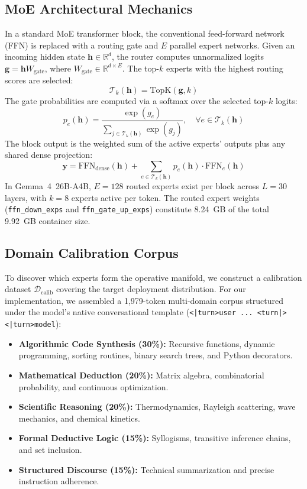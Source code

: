 \documentclass[conference]{IEEEtran}
\newcommand{\R}{\mathbb{R}}
\begin{document}
\subsection{MoE Architectural Mechanics}
In a standard MoE transformer block, the conventional feed-forward network (FFN) is replaced with a routing gate and $E$ parallel expert networks. Given an incoming hidden state $\mathbf{h} \in \R^d$, the router computes unnormalized logits $\mathbf{g} = \mathbf{h} W_\text{gate}$, where $W_\text{gate} \in \R^{d \times E}$. The top-$k$ experts with the highest routing scores are selected:
\begin{equation}
\mathcal{T}_k(\mathbf{h}) = \text{TopK}(\mathbf{g}, k)
\end{equation}
The gate probabilities are computed via a softmax over the selected top-$k$ logits:
\begin{equation}
p_e(\mathbf{h}) = \frac{\exp(g_e)}{\sum_{j \in \mathcal{T}_k(\mathbf{h})} \exp(g_j)}, \quad \forall e \in \mathcal{T}_k(\mathbf{h})
\end{equation}
The block output is the weighted sum of the active experts' outputs plus any shared dense projection:
\begin{equation}
\mathbf{y} = \text{FFN}_\text{dense}(\mathbf{h}) + \sum_{e \in \mathcal{T}_k(\mathbf{h})} p_e(\mathbf{h}) \cdot \text{FFN}_e(\mathbf{h})
\end{equation}
In Gemma~4~26B-A4B, $E = 128$ routed experts exist per block across $L = 30$ layers, with $k = 8$ experts active per token. The routed expert weights (\texttt{ffn\_down\_exps} and \texttt{ffn\_gate\_up\_exps}) constitute 8.24~GB of the total 9.92~GB container size.

\subsection{Domain Calibration Corpus}
To discover which experts form the operative manifold, we construct a calibration dataset $\mathcal{D}_\text{calib}$ covering the target deployment distribution. For our implementation, we assembled a 1,979-token multi-domain corpus structured under the model's native conversational template (\texttt{<|turn>user ... <turn|> <|turn>model}):
\begin{itemize}
\item \textbf{Algorithmic Code Synthesis (30\%):} Recursive functions, dynamic programming, sorting routines, binary search trees, and Python decorators.
\item \textbf{Mathematical Deduction (20\%):} Matrix algebra, combinatorial probability, and continuous optimization.
\item \textbf{Scientific Reasoning (20\%):} Thermodynamics, Rayleigh scattering, wave mechanics, and chemical kinetics.
\item \textbf{Formal Deductive Logic (15\%):} Syllogisms, transitive inference chains, and set inclusion.
\item \textbf{Structured Discourse (15\%):} Technical summarization and precise instruction adherence.
\end{itemize}
\end{document}
